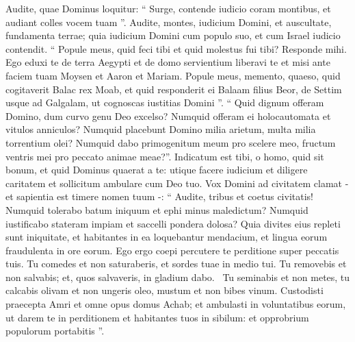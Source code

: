 \begin{biblechapter}
\begin{biblechapter}
\begin{biblechapter}
\begin{biblechapter}
\begin{biblechapter}
\begin{biblechapter}
 \verse Audite, quae Dominus loquitur:
 “ Surge, contende iudicio coram montibus,
 et audiant colles vocem tuam ”.
 \verse Audite, montes, iudicium Domini,
 et auscultate, fundamenta terrae;
 quia iudicium Domini cum populo suo,
 et cum Israel iudicio contendit.
 \verse “ Popule meus, quid feci tibi
 et quid molestus fui tibi?
 Responde mihi.
 \verse Ego eduxi te de terra Aegypti
 et de domo servientium liberavi te
 et misi ante faciem tuam Moysen
 et Aaron et Mariam.
 \verse Popule meus, memento, quaeso,
 quid cogitaverit Balac rex Moab,
 et quid responderit ei Balaam filius Beor,
 de Settim usque ad Galgalam,
 ut cognoscas iustitias Domini ”.
 \verse “ Quid dignum offeram Domino,
 dum curvo genu Deo excelso?
 Numquid offeram ei holocautomata
 et vitulos anniculos?
 \verse Numquid placebunt Domino milia arietum,
 multa milia torrentium olei?
 Numquid dabo primogenitum meum pro scelere meo,
 fructum ventris mei pro peccato animae meae?”.
 \verse Indicatum est tibi, o homo, quid sit bonum,
 et quid Dominus quaerat a te:
 utique facere iudicium et diligere caritatem
 et sollicitum ambulare cum Deo tuo.
 \verse Vox Domini ad civitatem clamat
 - et sapientia est timere nomen tuum -:
 “ Audite, tribus et coetus civitatis!
 \verse Numquid tolerabo batum iniquum
 et ephi minus maledictum?
 \verse Numquid iustificabo stateram impiam
 et saccelli pondera dolosa?
 \verse Quia divites eius repleti sunt iniquitate,
 et habitantes in ea loquebantur mendacium,
 et lingua eorum fraudulenta in ore eorum.
 \verse Ego ergo coepi percutere te
 perditione super peccatis tuis.
 \verse Tu comedes et non saturaberis,
 et sordes tuae in medio tui.
 Tu removebis et non salvabis;
 et, quos salvaveris, in gladium dabo. 
 \verse Tu seminabis et non metes,
 tu calcabis olivam et non ungeris oleo,
 mustum et non bibes vinum.
 \verse Custodisti praecepta Amri
 et omne opus domus Achab;
 et ambulasti in voluntatibus eorum,
 ut darem te in perditionem
 et habitantes tuos in sibilum:
 et opprobrium populorum portabitis ”.
 

\end{biblechapter}
\end{biblechapter}
\end{biblechapter}
\end{biblechapter}
\end{biblechapter}
\end{biblechapter}
